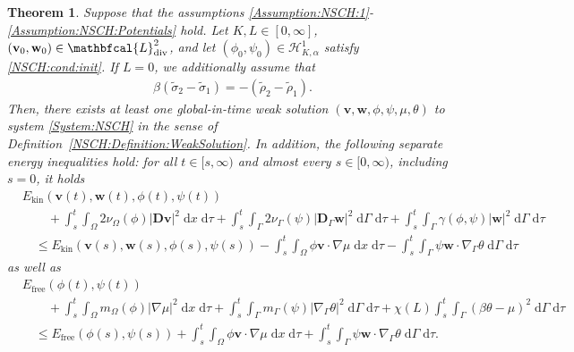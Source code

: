 \documentclass[11pt,reqno]{amsart}
\newtheorem{theorem}{Theorem}[section]
\theoremstyle{remark}
\numberwithin{equation}{section}
\newcommand{\abs}[1]{|#1|}
\newcommand{\intO}{\int_\Omega}
\newcommand{\intG}{\int_\Gamma}
\newcommand{\dx}{\;\mathrm{d}x}
\newcommand{\dxtau}{\;\mathrm{d}x\;\mathrm{d}\tau}
\newcommand{\dGtau}{\;\mathrm{d}\Ga\;\mathrm{d}\tau}
\newcommand{\dG}{\;\mathrm d\Ga}
\newcommand{\Grad}{\nabla}
\newcommand{\Div}{\textnormal{div}}
\newcommand{\Gradg}{\nabla_\Ga}
\newcommand{\Om}{\Omega}
\newcommand{\Ga}{\Gamma}
\newcommand{\bv}{\mathbf v}
\newcommand{\bw}{\mathbf w}
\newcommand{\D}{\mathbf D}
\newcommand{\Dg}{\mathbf D_\Ga}
\newcommand{\free}{\mathrm{free}}
\begin{document}
\begin{theorem}\label{NSCH:Theorem:ExistenceWeakSolutions}
Suppose that the assumptions \ref{Assumption:NSCH:1}-\ref{Assumption:NSCH:Potentials} hold.
Let $K,L\in[0,\infty]$, $(\bv_0,\bw_0)\in\mathbfcal{L}^2_\Div$, and let $(\phi_0,\psi_0)\in\mathcal{H}^1_{K,\alpha}$ satisfy \eqref{NSCH:cond:init}. If $L = 0$, we additionally assume that
    \begin{align}\label{Densities:Comp:Weak}
    	\beta(\tilde\sigma_2 - \tilde\sigma_1) = -(\tilde\rho_2 - \tilde\rho_1).
    \end{align}
    Then, there exists at least one global-in-time weak solution $(\bv,\bw,\phi,\psi,\mu,\theta)$ to system \eqref{System:NSCH} in the sense of Definition~\ref{NSCH:Definition:WeakSolution}.
    In addition, the following separate energy inequalities hold: for all $t\in[s,\infty)$ and almost every $s\in[0,\infty)$, including $s = 0$, it holds 
    \begin{align}\label{EnergyInequality:Kinetic}
        & E_\mathrm{kin}(\bv(t),\bw(t),\phi(t),\psi(t)) \nonumber \\%
        &\qquad + \int_s^t\intO 2\nu_\Om(\phi)\abs{\D\bv}^2\dxtau + \int_s^t\intG 2\nu_\Ga(\psi)\abs{\Dg\bw}^2\dGtau + \int_s^t\intG \gamma(\phi,\psi)\abs{\bw}^2\dGtau \nonumber \\
        &\quad\leq E_\mathrm{kin}(\bv(s),\bw(s),\phi(s),\psi(s))%
        - \int_s^t\intO \phi\bv\cdot\Grad\mu\dxtau- \int_s^t\intG \psi\bw\cdot\Gradg\theta\dGtau
    \end{align}
    as well as 
    \begin{align}\label{EnergyInequality:Free}
        &E_\free(\phi(t),\psi(t)) \nonumber \\
        &\qquad + \int_s^t\intO m_\Om(\phi)\abs{\Grad\mu}^2\dxtau + \int_s^t\intG m_\Ga(\psi)\abs{\Gradg\theta}^2\dGtau + \chi(L)\int_s^t\intG(\beta\theta-\mu)^2\dGtau \nonumber \\
        &\quad\leq E_\free(\phi(s),\psi(s)) + \int_s^t\intO \phi\bv\cdot\Grad\mu\dxtau + \int_s^t\intG \psi\bw\cdot\Gradg\theta\dGtau. 
    \end{align}
\end{theorem}
\end{document}
